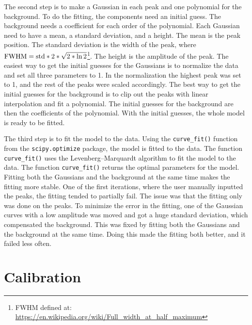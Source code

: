 The second step is to make a Gaussian in each peak and one polynomial for the background.
To do the fitting, the components need an initial guess.
The background needs a coefficient for each order of the polynomial.
Each Gaussian need to have a mean, a standard deviation, and a height.
The mean is the peak position.
The standard deviation is the width of the peak, where $\textnormal{FWHM} = \textnormal{std}*2*\sqrt{2*\ln{2}}$\footnote{FWHM defined at: \url{https://en.wikipedia.org/wiki/Full_width_at_half_maximum}}.
The height is the amplitude of the peak.
The easiest way to get the initial guesses for the Gaussians is to normalize the data and set all three parameters to 1.
In the normalization the highest peak was set to 1, and the rest of the peaks were scaled accordingly.
The best way to get the initial guesses for the background is to clip out the peaks with linear interpolation and fit a polynomial.
The initial guesses for the background are then the coefficients of the polynomial.
With the initial guesses, the whole model is ready to be fitted.

The third step is to fit the model to the data.
Using the \verb|curve_fit()| function from the \verb|scipy.optimize| package, the model is fitted to the data.
The function \verb|curve_fit()| uses the Levenberg–Marquardt algorithm to fit the model to the data.
The function \verb|curve_fit()| returns the optimal parameters for the model.
Fitting both the Gaussians and the background at the same time makes the fitting more stable.
One of the first iterations, where the user manually inputted the peaks, the fitting tended to partially fail.
The issue was that the fitting only was done on the peaks.
To minimize the error in the fitting, one of the Gaussian curves with a low amplitude was moved and got a huge standard deviation, which compensated the background.
This was fixed by fitting both the Gaussians and the background at the same time.
Doing this made the fitting both better, and it failed less often.

%
%
\section{Calibration}
\label{sec:discussion:calibration}

